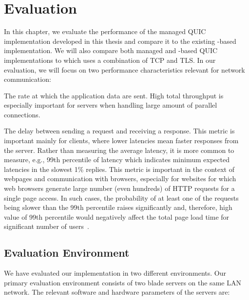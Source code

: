 \chapter{Evaluation}\label{chap:04-evaluation}

In this chapter, we evaluate the performance of the managed QUIC implementation developed in this
thesis and compare it to the existing \libmsquic{}-based implementation. We will also compare both
managed and \libmsquic{}-based QUIC implementations to  which uses a combination of
TCP and TLS\@. In our evaluation, we will focus on two performance characteristics relevant for
network communication:

\begin{itemize}

         The rate at which the application data are sent. High total throughput is
        especially important for servers when handling large amount of parallel connections.

         The delay between sending a request and receiving a
        response. This metric is important mainly for clients, where lower latencies mean faster
        responses from the server. Rather than measuring the average latency, it is more common to
        measure, e.g., 99th percentile of latency which indicates minimum expected latencies in the
        slowest 1\% replies. This metric is important in the context of webpages and communication
        with browsers, especially for websites for which web browsers generate large number (even
        hundreds) of HTTP requests for a single page access. In such cases, the probability of at
        least one of the requests being slower than the 99th percentile raises significantly and,
        therefore, high value of 99th percentile would negatively affect the total page load time
        for significant number of users~\cite{Treat2015}.

\end{itemize}

\section{Evaluation Environment}

We have evaluated our implementation in two different environments. Our primary evaluation
environment consists of two blade servers on the same LAN network. The relevant software and
hardware parameters of the servers are:

